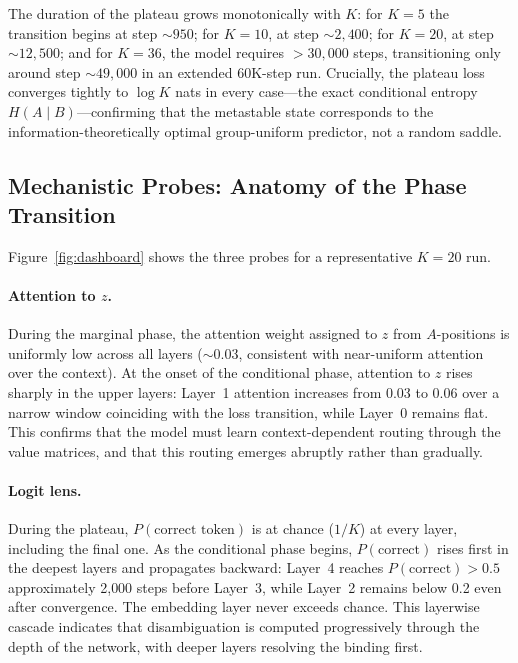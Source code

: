 The duration of the plateau grows monotonically with $K$: for $K{=}5$ the transition begins at step ${\sim}950$; for $K{=}10$, at step ${\sim}2{,}400$; for $K{=}20$, at step ${\sim}12{,}500$; and for $K{=}36$, the model requires $>30{,}000$ steps, transitioning only around step ${\sim}49{,}000$ in an extended 60K-step run. Crucially, the plateau loss converges tightly to $\log K$ nats in every case---the exact conditional entropy $H(A \mid B)$---confirming that the metastable state corresponds to the information-theoretically optimal group-uniform predictor, not a random saddle.

\subsection{Mechanistic Probes: Anatomy of the Phase Transition}

Figure~\ref{fig:dashboard} shows the three probes for a representative $K{=}20$ run.

\paragraph{Attention to $z$.}
During the marginal phase, the attention weight assigned to $z$ from $A$-positions is uniformly low across all layers (${\sim}0.03$, consistent with near-uniform attention over the context). At the onset of the conditional phase, attention to $z$ rises sharply in the upper layers: Layer~1 attention increases from 0.03 to 0.06 over a narrow window coinciding with the loss transition, while Layer~0 remains flat. This confirms that the model must learn context-dependent routing through the value matrices, and that this routing emerges abruptly rather than gradually.

\paragraph{Logit lens.}
During the plateau, $P(\text{correct token})$ is at chance ($1/K$) at every layer, including the final one. As the conditional phase begins, $P(\text{correct})$ rises first in the deepest layers and propagates backward: Layer~4 reaches $P(\text{correct}) > 0.5$ approximately 2{,}000 steps before Layer~3, while Layer~2 remains below 0.2 even after convergence. The embedding layer never exceeds chance. This layerwise cascade indicates that disambiguation is computed progressively through the depth of the network, with deeper layers resolving the binding first.

